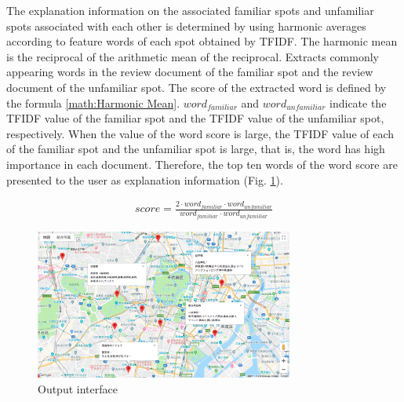 \documentclass[journal]{IAENGtran}
\begin{document}
The explanation information on the associated familiar spots and unfamiliar spots associated with each other is determined by using harmonic averages according to feature words of each spot obtained by TFIDF.
The harmonic mean is the reciprocal of the arithmetic mean of the reciprocal.
Extracts commonly appearing words in the review document of the familiar spot and the review document of the unfamiliar spot.
The score of the extracted word is defined by the formula \ref{math:Harmonic Mean}.
$word_{familiar}$ and $word_{unfamiliar}$ indicate the TFIDF value of the familiar spot and the TFIDF value of the unfamiliar spot, respectively.
When the value of the word score is large, the TFIDF value of each of the familiar spot and the unfamiliar spot is large, that is, the word has high importance in each document.
Therefore, the top ten words of the word score are presented to the user as explanation information (Fig. \ref{fig:photo_map}).

\begin{eqnarray}
  score = \frac{2\cdot{word_{familiar}}\cdot{word_{unfamiliar}}}{word_{familiar}\cdot{word_{unfamiliar}}}
  \label{math:Harmonic Mean}
\end{eqnarray}


\begin{figure}[t]
  \begin{center}
    \includegraphics[clip,width=8.5cm,bb=0 0 1289 750]{picture/Photo_Map.png}
    \caption{Output interface}
    \label{fig:photo_map}
   \end{center}
\end{figure}
\end{document}
